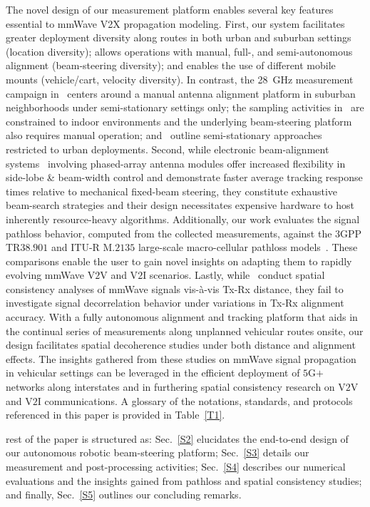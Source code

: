 \documentclass[10pt, twocolumn]{IEEEtran}
\begin{document}
The novel design of our measurement platform enables several key features essential to mmWave V2X propagation modeling. First, our system facilitates greater deployment diversity along routes in both urban and suburban settings (location diversity); allows operations with manual, full-, and semi-autonomous alignment (beam-steering diversity); and enables the use of different mobile mounts (vehicle/cart, velocity diversity). In contrast, the \SI{28}{\giga\hertz} measurement campaign in~\cite{Purdue} centers around a manual antenna alignment platform in suburban neighborhoods under semi-stationary settings only; the sampling activities in~\cite{Harvard} are constrained to indoor environments and the underlying beam-steering platform also requires manual operation; and~\cite{MolischSpatialOutdoor, Outdoor28G} outline semi-stationary approaches restricted to urban deployments. Second, while electronic beam-alignment systems~\cite{Agile-Link} involving phased-array antenna modules offer increased flexibility in side-lobe \& beam-width control and demonstrate faster average tracking response times relative to mechanical fixed-beam steering, they constitute exhaustive beam-search strategies and their design necessitates expensive hardware to host inherently resource-heavy algorithms. Additionally, our work evaluates the signal pathloss behavior, computed from the collected measurements, against the $3$GPP TR$38.901$ and ITU-R M$.2135$ large-scale macro-cellular pathloss models~\cite{MacCartneyModelsOverview}. These comparisons enable the user to gain novel insights on adapting them to rapidly evolving mmWave V$2$V and V$2$I scenarios. Lastly, while~\cite{MolischSpatialOutdoor, MacCartneySpatialStatistics} conduct spatial consistency analyses of mmWave signals vis-\`{a}-vis Tx-Rx distance, they fail to investigate signal decorrelation behavior under variations in Tx-Rx alignment accuracy. With a fully autonomous alignment and tracking platform that aids in the continual series of measurements along unplanned vehicular routes onsite, our design facilitates spatial decoherence studies under both distance and alignment effects. The insights gathered from these studies on mmWave signal propagation in vehicular settings can be leveraged in the efficient deployment of $5$G$+$ networks along interstates and in furthering spatial consistency research on V$2$V and V$2$I communications. A glossary of the notations, standards, and protocols referenced in this paper is provided in Table~\ref{T1}.

 rest of the paper is structured as: Sec.~\ref{S2} elucidates the end-to-end design of our autonomous robotic beam-steering platform; Sec.~\ref{S3} details our measurement and post-processing activities; Sec.~\ref{S4} describes our numerical evaluations and the insights gained from pathloss and spatial consistency studies; and finally, Sec.~\ref{S5} outlines our concluding remarks.
\vspace{-3mm}
\end{document}
